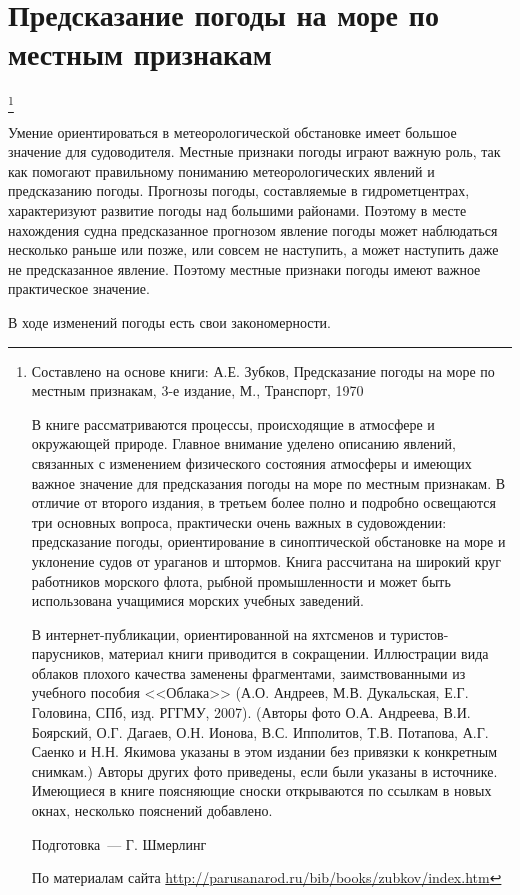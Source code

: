 \section{Предсказание погоды на море по местным признакам}\footnote{
Составлено на основе книги: А.Е. Зубков, Предсказание погоды на море
по местным признакам, 3-е издание, М., Транспорт, 1970

В книге рассматриваются процессы, происходящие в атмосфере и
окружающей природе. Главное внимание уделено описанию явлений,
связанных с изменением физического состояния атмосферы и имеющих
важное значение для предсказания погоды на море по местным
признакам. В отличие от второго издания, в третьем более полно и
подробно освещаются три основных вопроса, практически очень важных в
судовождении: предсказание погоды, ориентирование в синоптической
обстановке на море и уклонение судов от ураганов и штормов. Книга
рассчитана на широкий круг работников морского флота, рыбной
промышленности и может быть использована учащимися морских учебных
заведений.

В интернет-публикации, ориентированной на яхтсменов и
туристов-парусников, материал книги приводится в
сокращении. Иллюстрации вида облаков плохого качества заменены
фрагментами, заимствованными из учебного пособия <<Облака>>
(А.О. Андреев, М.В. Дукальская, Е.Г. Головина, СПб, изд. РГГМУ,
2007). (Авторы фото О.А. Андреева, В.И. Боярский, О.Г. Дагаев,
О.Н. Ионова, В.С. Ипполитов, Т.В. Потапова, А.Г. Саенко и Н.Н. Якимова
указаны в этом издании без привязки к конкретным снимкам.) Авторы
других фото приведены, если были указаны в источнике. Имеющиеся в
книге поясняющие сноски открываются по ссылкам в новых окнах,
несколько пояснений добавлено.

Подготовка~--- Г. Шмерлинг

По материалам сайта \url{http://parusanarod.ru/bib/books/zubkov/index.htm}}

Умение ориентироваться в метеорологической обстановке имеет большое
значение для судоводителя. Местные признаки погоды играют важную роль,
так как помогают правильному пониманию метеорологических явлений и
предсказанию погоды. Прогнозы погоды, составляемые в гидрометцентрах,
характеризуют развитие погоды над большими районами. Поэтому в месте
нахождения судна предсказанное прогнозом явление погоды может
наблюдаться несколько раньше или позже, или совсем не наступить, а
может наступить даже не предсказанное явление. Поэтому местные
признаки погоды имеют важное практическое значение.

В ходе изменений погоды есть свои закономерности.

